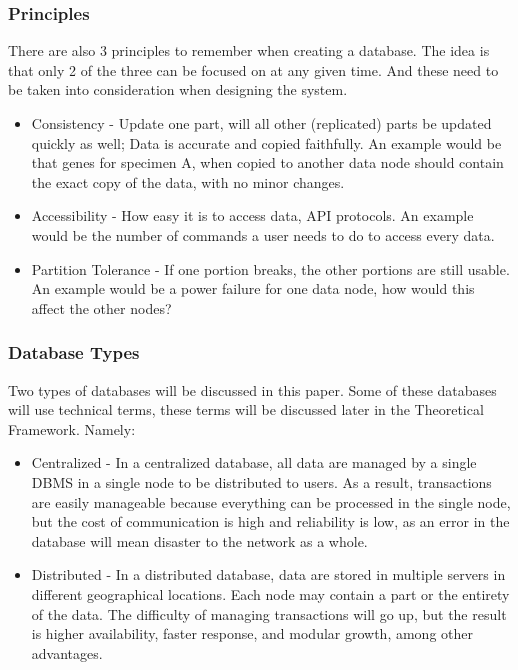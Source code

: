 \documentclass{article}
\begin{document}

\subsubsection{Principles} 
There are also 3 principles to remember when creating a database. The idea is that only 2 of the three can be focused on at any given time. And these need to be taken into consideration when designing the system. \autocite{Silberschatz2010}

\begin{itemize}
    \item Consistency - Update one part, will all other (replicated) parts be updated quickly as well; Data is accurate and copied faithfully. An example would be that genes for specimen A, when copied to another data node should contain the exact copy of the data, with no minor changes.
    \item Accessibility - How easy it is to access data, API protocols. An example would be the number of commands  a user needs to do to access every data.
    \item Partition Tolerance - If one portion breaks, the other portions are still usable. An example would be a power failure for one data node, how would this affect the other nodes?
\end{itemize}

\subsubsection{Database Types} 
Two types of databases will be discussed in this paper. Some of these databases will use technical terms, these terms will be discussed later in the Theoretical Framework. Namely: \autocite{centralizedvsdistributed}

\begin{itemize}
    \item Centralized - In a centralized database, all data are managed by a single DBMS in a single node to be distributed to users. As a result, transactions are easily manageable because everything can be processed in the single node, but the cost of communication is high and reliability is low, as an error in the database will mean disaster to the network as a whole.
    \item Distributed - In a distributed database, data are stored in multiple servers in different geographical locations. Each node may contain a part or the entirety of the data. The difficulty of managing transactions will go up, but the result is higher availability, faster response, and modular growth, among other advantages. 
\end{itemize}
\end{document}
